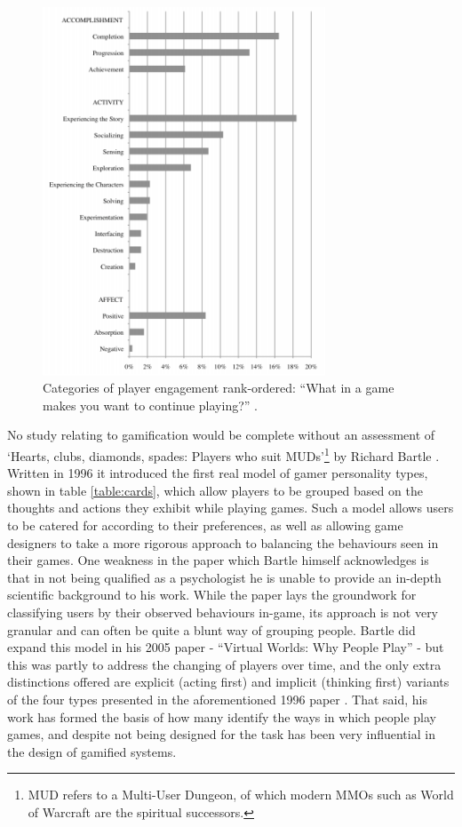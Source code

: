 \documentclass[12pt,a4paper,twoside]{report}
\begin{document}
\begin{figure}
\begin{center}
	\includegraphics[width=0.75\textwidth]{../img/fog.png}
	\caption{Categories of player engagement rank-ordered: ``What in a game makes you want to continue playing?'' \cite{schoenau2011player}.}
	\label{fog}
\end{center}
\end{figure}

No study relating to gamification would be complete without an assessment of `Hearts, clubs, diamonds, spades: Players who suit MUDs'\footnote{MUD refers to a Multi-User Dungeon, of which modern MMOs such as World of Warcraft are the spiritual successors.} by Richard Bartle \cite{bartle1996hearts}. Written in 1996 it introduced the first real model of gamer personality types, shown in table \ref{table:cards}, which allow players to be grouped based on the thoughts and actions they exhibit while playing games. Such a model allows users to be catered for according to their preferences, as well as allowing game designers to take a more rigorous approach to balancing the behaviours seen in their games.  One weakness in the paper which Bartle himself acknowledges is that in not being qualified as a psychologist he is unable to provide an in-depth scientific background to his work. While the paper lays the groundwork for classifying users by their observed behaviours in-game, its approach is not very granular and can often be quite a blunt way of grouping people. Bartle did expand this model in his 2005 paper - ``Virtual Worlds: Why People Play'' \cite{bartle2005play} - but this was partly to address the changing of players over time, and the only extra distinctions offered are explicit (acting first) and implicit (thinking first) variants of the four types presented in the aforementioned 1996 paper \cite{bartle1996hearts}. That said, his work has formed the basis of how many identify the ways in which people play games, and despite not being designed for the task has been very influential in the design of gamified systems.
\end{document}
